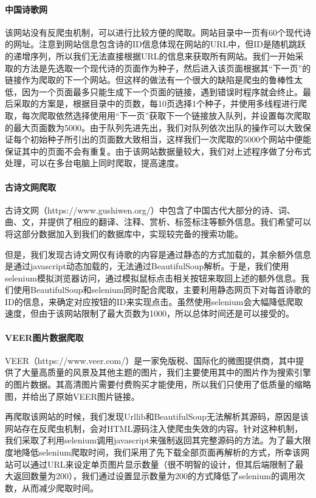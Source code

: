 \documentclass[a4paper, 10pt]{article}
\begin{document}
\paragraph{中国诗歌网} 该网站没有反爬虫机制，可以进行比较方便的爬取。网站目录中一页有60个现代诗的网址。注意到网站信息包含诗的ID信息体现在网站的URL中，但ID是随机跳跃的递增序列，所以我们无法直接根据URL的信息来获取所有网站。我们一开始采取的方法是先选取一个现代诗的页面作为种子，然后进入该页面根据其“下一页”的链接作为爬取的下一个网站。但这样的做法有一个很大的缺陷是爬虫的鲁棒性太低，因为一个页面最多只能生成下一个页面的链接，遇到错误时程序就会终止。最后采取的方案是，根据目录中的页数，每10页选择1个种子，并使用多线程进行爬取，每次爬取依然选择使用用“下一页”获取下一个链接放入队列，并设置每次爬取的最大页面数为5000。由于队列先进先出，我们对队列依次出队的操作可以大致保证每个初始种子所引出的页面数大致相当，这样我们一次爬取的5000个网站中便能保证其中的页面不会有重复。由于该网站数据量较大，我们对上述程序做了分布式处理，可以在多台电脑上同时爬取，提高速度。

\paragraph{古诗文网爬取}
古诗文网（https://www.gushiwen.org/）中包含了中国古代大部分的诗、词、曲、文，并提供了相应的翻译、注释、赏析、标签标注等额外信息。我们希望可以将这部分数据加入到我们的数据库中，实现较完备的搜索功能。

但是，我们发现古诗文网仅有诗歌的内容是通过静态的方式加载的，其余额外信息是通过javascript动态加载的，无法通过BeautifulSoup解析。于是，我们使用selenium模拟浏览器访问，通过模拟鼠标点击相关按钮来取回上述的额外信息。我们使用BeautifulSoup和selenium同时配合爬取，主要利用静态网页下对每首诗歌的ID的信息，来确定对应按钮的ID来实现点击。虽然使用selenium会大幅降低爬取速度，但由于该网站限制了最大页数为1000，所以总体时间还是可以接受的。

\paragraph{VEER图片数据爬取}
VEER（https://www.veer.com/）是一家免版税、国际化的微图提供商，其中提供了大量高质量的风景及其他主题的图片，我们主要使用其中的图片作为搜索引擎的图片数据。其高清图片需要付费购买才能使用，所以我们只使用了低质量的缩略图，并给出了原始VEER图片链接。

再爬取该网站的时候，我们发现Urllib和BeautifulSoup无法解析其源码，原因是该网站存在反爬虫机制，会对HTML源码注入使爬虫失效的内容。针对这种机制，我们采取了利用selenium调用javascript来强制返回其完整源码的方法。为了最大限度地降低selenium爬取时间，我们采用了先下载全部页面再解析的方式，所幸该网站可以通过URL来设定单页图片显示数量（很不明智的设计，但其后端限制了最大返回数量为200），我们通过设置显示数量为200的方式降低了selenium的调用次数，从而减少爬取时间。
\end{document}
